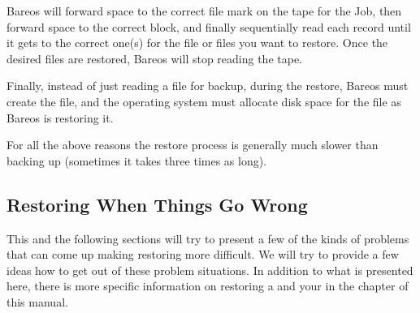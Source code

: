 Bareos will forward space to the correct file mark on the tape for the Job,
then forward space to the correct block, and finally sequentially read each
record until it gets to the correct one(s) for the file or files you want to
restore. Once the desired files are restored, Bareos will stop reading the
tape.

Finally, instead of just reading a file for backup, during the restore, Bareos
must create the file, and the operating system must allocate disk space for
the file as Bareos is restoring it.

For all the above reasons the restore process is generally much slower than
backing up (sometimes it takes three times as long).


\subsection{Restoring When Things Go Wrong}
\label{sec:RestoreCatalog}


This and the following sections will try to present a few of the kinds of
problems that can come up making restoring more difficult. We will try to
provide a few ideas how to get out of these problem situations.
In addition to what is presented here, there is more specific information
on restoring a  and your
 in the  chapter of this manual.

